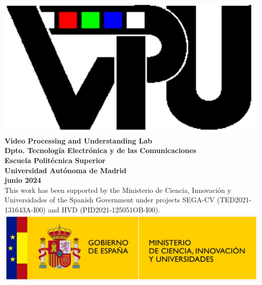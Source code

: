 
\vspace*{3cm} 
\begin{center}
    \includegraphics[clip,scale=0.25]{logoVPU.jpeg} \\ \textbf{Video Processing and Understanding Lab}\\
    \textbf{Dpto. Tecnología Electrónica y de las Comunicaciones}\\
    \textbf{Escuela Politécnica Superior}\\
    \textbf{Universidad Autónoma de Madrid }\\
    \textbf{junio 2024}\\
    \vspace*{3cm} 
    This work has been supported by the Ministerio de Ciencia, Innovación y Universidades of the Spanish Government under projects SEGA-CV (TED2021-131643A-I00) and HVD (PID2021-125051OB-I00). \\ 
    \vspace*{1cm} 
    \includegraphics[clip,scale=0.25]{logoMinisterio.jpeg} 
\end{center}